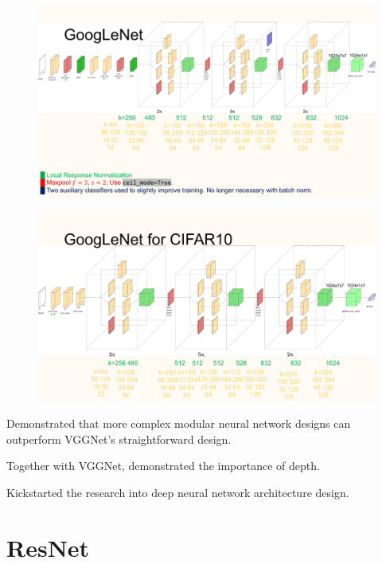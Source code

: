 \begin{definition}
    \begin{figure}[H]
        \centering
        \includegraphics[width=1.0\textwidth]{.././assets/7.13.jpg}
    \end{figure}
\end{definition}

\begin{definition}
    \begin{figure}[H]
        \centering
        \includegraphics[width=1.0\textwidth]{.././assets/7.14.jpg}
    \end{figure}
\end{definition}

\begin{concept}
    Demonstrated that more complex modular neural network designs can outperform VGGNet's straightforward design.

    Together with VGGNet, demonstrated the importance of depth.

    Kickstarted the research into deep neural network architecture design.
\end{concept}

\section{ResNet}
